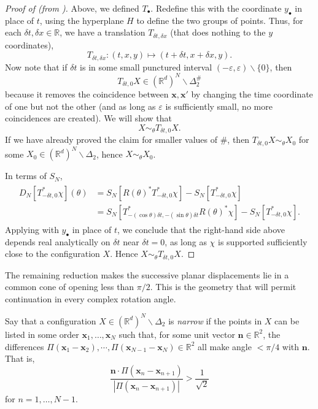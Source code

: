 \documentclass[11pt, letterpaper, reqno]{amsart}
\theoremstyle{definition}
\theoremstyle{remark}
\newcommand{\bbR}{\mathbb{R}}
\newcommand{\bfn}{\mathbf{n}}
\newcommand{\bfx}{\mathbf{x}}
\begin{document}
\begin{proof}[Proof of  (from )]
    
    Above, we defined $T_\bullet$. Redefine this with the coordinate $y_\bullet$ in place of $t$, using the hyperplane $H$ to define the two groups of points. Thus, for each $\delta t,\delta x\in \bbR$, we have a translation $T_{\delta t,\delta x}$ (that does nothing to the $y$ coordinates), 
    \begin{equation}
        T_{\delta t,\delta x}:(t,x,y)\mapsto (t+\delta t,x+\delta x,y).
    \end{equation}
    Now note that if $\delta t$ is in some small punctured interval $(-\varepsilon,\varepsilon)\backslash \{0\}$, then 
    \begin{equation}
        T_{\delta t,0} X  \in (\bbR^d)^N\backslash \Delta_2^\# 
    \end{equation}
    because it removes the coincidence between $\bfx,\bfx'$ by changing the time coordinate of one but not the other (and as long as $\varepsilon$ is sufficiently small, no more coincidences are created). We will show that 
    \begin{equation}
        X\sim_\theta T_{\delta t,0} X .
    \end{equation}
    If we have already proved the claim for smaller values of $\#$, then $T_{\delta t,0} X\sim_\theta X_0$ for some $X_0\in (\bbR^d)^N\backslash \Delta_2$, hence $X\sim_\theta X_0$. 

     In terms of $S_N$, 
    \begin{align}
    \begin{split} 
        D_N[T_{-\delta t,0}^* \chi ](\theta) &= S_N[R(\theta)^* T_{-\delta t,0}^* \chi] - S_N[T_{-\delta t,0}^* \chi] \\
        &= S_N[T_{-(\cos \theta )\delta t, -(\sin \theta)\delta t}^* R(\theta)^*  \chi] - S_N[T_{-\delta t,0}^* \chi].
        \end{split} 
    \end{align}
    Applying  with $y_\bullet$ in place of $t$, we conclude that the right-hand side above depends real analytically on $\delta t$ near $\delta t=0$, as long as $\chi$ is supported sufficiently close to the configuration $X$. Hence $X\sim_\theta T_{\delta t,0} X$.
\end{proof}

The remaining reduction makes the successive planar displacements lie
in a common cone of opening less than $\pi/2$. This is the geometry
that will permit continuation in every complex rotation angle.


Say that a configuration $X \in (\bbR^d)^N\backslash \Delta_2$ is \emph{narrow} if the points in $X$ can be listed in some order $\bfx_1,\dots,\bfx_N$ such that, for some unit vector $\bfn\in \bbR^2$, the differences $\Pi(\bfx_{1} - \bfx_{2}),\cdots , \Pi(\bfx_{N-1}-\bfx_N)\in \bbR^2$ all make angle $<\pi/4$ with $\bfn$. That is, 
\begin{equation}
    \frac{\bfn \cdot \Pi (\bfx_{n} - \bfx_{n+1} )}{|\Pi(\bfx_{n} - \bfx_{n+1})|} > \frac{1}{\sqrt{2}}
\end{equation}
for $n=1,\dots,N-1$. 
\end{document}
